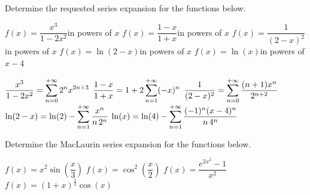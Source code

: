 \ifcalculus


\subsection*{}


\begin{Exercise}
Determine the requested series expansion for the functions below. 
\begin{multicols}{2}
    \Question[difficulty = 2] $f(x)=\dfrac{x^3}{1-2x^2}$\qquad in powers of $x$
    \Question[difficulty = 2] $f(x) = \dfrac{1-x}{1+x} $\qquad in powers of $x$
    \Question[difficulty = 3] $f(x)=\dfrac{1}{(2-x)^2} $\qquad in powers of $x$
    \Question[difficulty = 3] $f(x)=\ln (2-x)$\qquad in powers of $x$
    \Question[difficulty = 3] $f(x)=\ln (x)$\qquad in powers of $x-4$
    \EndCurrentQuestion
\end{multicols}

\end{Exercise}

\begin{Answer}\phantom{}
    \begin{multicols}{2}
        
        \Question $\dfrac{x^3}{1-2x^2} = \displaystyle\sum_{n=0}^{+\infty} 2^n x^{2n+3}$
        \Question $\dfrac{1-x}{1+x} = 1 + 2 \displaystyle\sum_{n=1}^{+\infty}  (-x)^n $ 
        \Question $\dfrac{1}{(2-x)^2} = \displaystyle\sum_{n=0}^{+\infty} \dfrac{(n+1)x^n}{2^{n+2}}$     
        \Question $\ln (2-x) = \ln (2) -  \displaystyle\sum_{n=1}^{+\infty} \dfrac{x^{n}}{n\,2^{n}}$ 
        \Question $\ln (x) = \ln (4) - \displaystyle\sum_{n=1}^{+\infty} \dfrac{(-1)^n (x-4)^n}{n\,4^n}$ 
        \EndCurrentQuestion 
    \end{multicols}
\end{Answer}

\begin{Exercise} Determine the MacLaurin series expansion for the functions below.
\begin{multicols}{2}
    \Question[difficulty = 1] $f(x) = x^2 \sin \left(\dfrac{x}{3} \right) $
    \Question[difficulty = 2] $f(x) = \cos^2\left(\dfrac{x}{2} \right) $
    \Question[difficulty = 2] $f(x)=\dfrac{e^{2x^2}-1}{x^2} $
    \Question[difficulty = 2] $f(x) = (1+x)^{\frac{1}{2}} \cos (x) $
    \EndCurrentQuestion
\end{multicols}
\end{Exercise}

